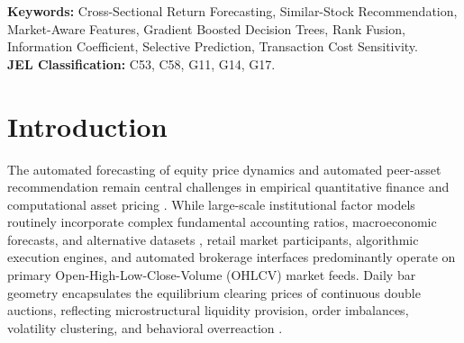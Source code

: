 \documentclass[11pt,a4paper]{article}
\begin{document}
\begin{abstract}
For portfolio asset recommendation, we formalize and test three paradigms: Method A (Prediction-Only Top-5), Method B (Similarity-Only Top-5 via trailing 252-day return correlation), and Method C (Combined 50/50 Rank Fusion). Across 6,100 out-of-time recommendation portfolios (1,220 evaluation windows), Method A delivers high gross arithmetic mean excess return ($+1.663\%$) but suffers severe tracking error volatility ($10.856\%$), negative median excess return ($-0.914\%$), and low win rate ($47.54\%$). Method B yields negligible excess return ($-0.068\%$). In contrast, Method C rank fusion achieves an empirical measurement of $88.0\%$ variance reduction relative to Method A in the evaluated historical sample ($10.856\% \to 3.755\%$), while delivering a positive median excess return ($+0.007\%$), a gross mean excess return of $+0.113\%$, and a $50.25\%$ hit rate. Under simulated transaction costs, Method C remains positive at 5 bps ($+0.071\%$ net) and 10 bps ($+0.028\%$ net), turning slightly negative at 15 bps ($-0.014\%$) due to $85.1\%$ turnover. Post-hoc exploratory analyses at $H=1$ day and volatility-penalized rankings are disclosed with explicit multiplicity caveats. All data pipelines, features, and evaluation scripts are made fully reproducible.
\end{abstract}

\noindent\textbf{Keywords:} Cross-Sectional Return Forecasting, Similar-Stock Recommendation, Market-Aware Features, Gradient Boosted Decision Trees, Rank Fusion, Information Coefficient, Selective Prediction, Transaction Cost Sensitivity. \\
\noindent\textbf{JEL Classification:} C53, C58, G11, G14, G17.

\section{Introduction}
The automated forecasting of equity price dynamics and automated peer-asset recommendation remain central challenges in empirical quantitative finance and computational asset pricing \cite{gu2020empirical, kelly2019characteristics}. While large-scale institutional factor models routinely incorporate complex fundamental accounting ratios, macroeconomic forecasts, and alternative datasets \cite{green2017characteristics}, retail market participants, algorithmic execution engines, and automated brokerage interfaces predominantly operate on primary Open-High-Low-Close-Volume (OHLCV) market feeds. Daily bar geometry encapsulates the equilibrium clearing prices of continuous double auctions, reflecting microstructural liquidity provision, order imbalances, volatility clustering, and behavioral overreaction \cite{roll1984simple, amihud2002illiquidity}.
\end{document}
